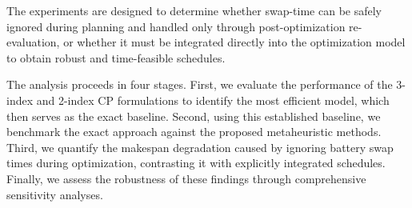 \documentclass[3p, authoryear, 11pt]{elsarticle}
\begin{document}
The experiments are designed to determine whether swap-time can be safely ignored during planning and handled only through post-optimization re-evaluation, or whether it must be integrated directly into the optimization model to obtain robust and time-feasible schedules.

The analysis proceeds in four stages. First, we evaluate the performance of the 3-index and 2-index CP formulations to identify the most efficient model, which then serves as the exact baseline. Second, using this established baseline, we benchmark the exact approach against the proposed metaheuristic methods. Third, we quantify the makespan degradation caused by ignoring battery swap times during optimization, contrasting it with explicitly integrated schedules. Finally, we assess the robustness of these findings through comprehensive sensitivity analyses.




\end{document}
